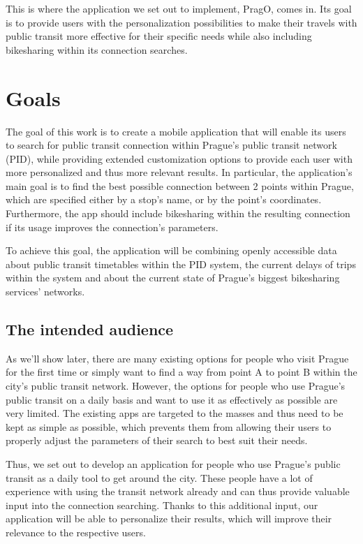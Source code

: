 This is where the application we set out to implement, PragO, comes in. Its goal is to provide users with the personalization possibilities to make their travels with public transit more effective for their specific needs while also including bikesharing within its connection searches. 

\section{Goals}

The goal of this work is to create a mobile application that will enable its users to search for public transit connection within Prague's public transit network (PID), while providing extended customization options to provide each user with more personalized and thus more relevant results. In particular, the application's main goal is to find the best possible connection between 2 points within Prague, which are specified either by a stop's name, or by the point's coordinates. Furthermore, the app should include bikesharing within the resulting connection if its usage improves the connection's parameters.

To achieve this goal, the application will be combining openly accessible data about public transit timetables within the PID system, the current delays of trips within the system and about the current state of Prague's biggest bikesharing services' networks.

\subsection{The intended audience}

As we'll show later, there are many existing options for people who visit Prague for the first time or simply want to find a way from point A to point B within the city's public transit network. However, the options for people who use Prague's public transit on a daily basis and want to use it as effectively as possible are very limited. The existing apps are targeted to the masses and thus need to be kept as simple as possible, which prevents them from allowing their users to properly adjust the parameters of their search to best suit their needs.

Thus, we set out to develop an application for people who use Prague's public transit as a daily tool to get around the city. These people have a lot of experience with using the transit network already and can thus provide valuable input into the connection searching. Thanks to this additional input, our application will be able to personalize their results, which will improve their relevance to the respective users.

